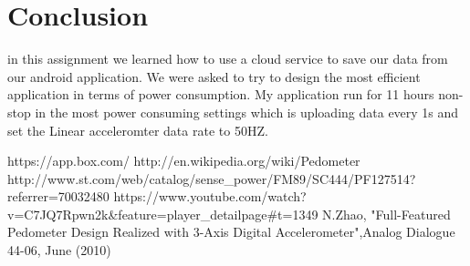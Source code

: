 \documentclass[conference]{IEEEtran}
\begin{document}
\section{Conclusion}
in this assignment we learned how to use a cloud service to save our data from our android application. We were asked to try to design the most efficient application in terms of power consumption. My application run for 11 hours non-stop in the most power consuming settings which is uploading data every 1s and set the Linear acceleromter data rate to 50HZ. 

\begin{thebibliography}{1}
https://app.box.com/
http://en.wikipedia.org/wiki/Pedometer
http://www.st.com/web/catalog/sense\_power/FM89/SC444/PF127514?referrer=70032480
https://www.youtube.com/watch?v=C7JQ7Rpwn2k\&feature=player\_detailpage\#t=1349
N.Zhao, "Full-Featured Pedometer Design Realized with 3-Axis Digital Accelerometer",Analog Dialogue 44-06, June (2010)


\end{thebibliography}
\end{document}
